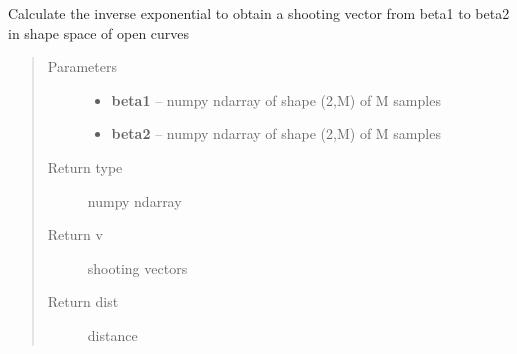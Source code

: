 \documentclass[letterpaper,10pt,english]{sphinxmanual}
\begin{document}

\begin{fulllineitems}
\label{curve_functions:curve_functions.inverse_exp_coord}
Calculate the inverse exponential to obtain a shooting vector from
beta1 to beta2 in shape space of open curves
\begin{quote}\begin{description}
\item[{Parameters}] \leavevmode\begin{itemize}
\item {} 
\textbf{beta1} -- numpy ndarray of shape (2,M) of M samples

\item {} 
\textbf{beta2} -- numpy ndarray of shape (2,M) of M samples

\end{itemize}

\item[{Return type}] \leavevmode
numpy ndarray

\item[{Return v}] \leavevmode
shooting vectors

\item[{Return dist}] \leavevmode
distance

\end{description}\end{quote}

\end{fulllineitems}

\end{document}
